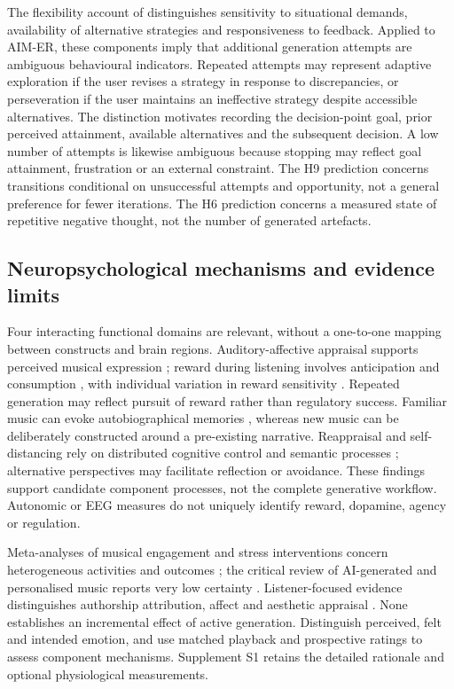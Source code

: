\documentclass[11pt,a4paper]{article}
\begin{document}
The flexibility account of \citet{bonanno2013} distinguishes sensitivity to situational demands, availability of alternative strategies and responsiveness to feedback. Applied to AIM-ER, these components imply that additional generation attempts are ambiguous behavioural indicators. Repeated attempts may represent adaptive exploration if the user revises a strategy in response to discrepancies, or perseveration if the user maintains an ineffective strategy despite accessible alternatives. The distinction motivates recording the decision-point goal, prior perceived attainment, available alternatives and the subsequent decision. A low number of attempts is likewise ambiguous because stopping may reflect goal attainment, frustration or an external constraint. The H9 prediction concerns transitions conditional on unsuccessful attempts and opportunity, not a general preference for fewer iterations. The H6 prediction concerns a measured state of repetitive negative thought, not the number of generated artefacts.

\subsection{Neuropsychological mechanisms and evidence limits}
Four interacting functional domains are relevant, without a one-to-one mapping between constructs and brain regions. Auditory-affective appraisal supports perceived musical expression \citep{koelsch2014}; reward during listening involves anticipation and consumption \citep{salimpoor2011,ferreri2019}, with individual variation in reward sensitivity \citep{mas2014}. Repeated generation may reflect pursuit of reward rather than regulatory success. Familiar music can evoke autobiographical memories \citep{janata2009}, whereas new music can be deliberately constructed around a pre-existing narrative. Reappraisal and self-distancing rely on distributed cognitive control and semantic processes \citep{ochsner2012,kross2011}; alternative perspectives may facilitate reflection or avoidance. These findings support candidate component processes, not the complete generative workflow. Autonomic or EEG measures do not uniquely identify reward, dopamine, agency or regulation.

Meta-analyses of musical engagement and stress interventions concern heterogeneous activities and outcomes \citep{peters2024,dewitte2020}; the critical review of AI-generated and personalised music reports very low certainty \citep{jin2026}. Listener-focused evidence distinguishes authorship attribution, affect and aesthetic appraisal \citep{hesun2026}. None establishes an incremental effect of active generation. Distinguish perceived, felt and intended emotion, and use matched playback and prospective ratings to assess component mechanisms. Supplement S1 retains the detailed rationale and optional physiological measurements.
\end{document}
